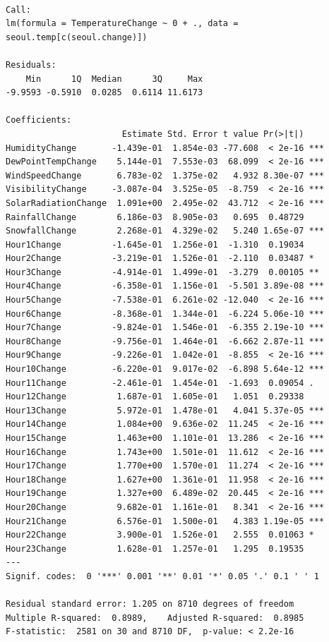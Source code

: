\documentclass[
  letterpaper,
  DIV=11,
  numbers=noendperiod]{scrartcl}
\begin{document}
\begin{verbatim}

Call:
lm(formula = TemperatureChange ~ 0 + ., data = seoul.temp[c(seoul.change)])

Residuals:
    Min      1Q  Median      3Q     Max 
-9.9593 -0.5910  0.0285  0.6114 11.6173 

Coefficients:
                       Estimate Std. Error t value Pr(>|t|)    
HumidityChange       -1.439e-01  1.854e-03 -77.608  < 2e-16 ***
DewPointTempChange    5.144e-01  7.553e-03  68.099  < 2e-16 ***
WindSpeedChange       6.783e-02  1.375e-02   4.932 8.30e-07 ***
VisibilityChange     -3.087e-04  3.525e-05  -8.759  < 2e-16 ***
SolarRadiationChange  1.091e+00  2.495e-02  43.712  < 2e-16 ***
RainfallChange        6.186e-03  8.905e-03   0.695  0.48729    
SnowfallChange        2.268e-01  4.329e-02   5.240 1.65e-07 ***
Hour1Change          -1.645e-01  1.256e-01  -1.310  0.19034    
Hour2Change          -3.219e-01  1.526e-01  -2.110  0.03487 *  
Hour3Change          -4.914e-01  1.499e-01  -3.279  0.00105 ** 
Hour4Change          -6.358e-01  1.156e-01  -5.501 3.89e-08 ***
Hour5Change          -7.538e-01  6.261e-02 -12.040  < 2e-16 ***
Hour6Change          -8.368e-01  1.344e-01  -6.224 5.06e-10 ***
Hour7Change          -9.824e-01  1.546e-01  -6.355 2.19e-10 ***
Hour8Change          -9.756e-01  1.464e-01  -6.662 2.87e-11 ***
Hour9Change          -9.226e-01  1.042e-01  -8.855  < 2e-16 ***
Hour10Change         -6.220e-01  9.017e-02  -6.898 5.64e-12 ***
Hour11Change         -2.461e-01  1.454e-01  -1.693  0.09054 .  
Hour12Change          1.687e-01  1.605e-01   1.051  0.29338    
Hour13Change          5.972e-01  1.478e-01   4.041 5.37e-05 ***
Hour14Change          1.084e+00  9.636e-02  11.245  < 2e-16 ***
Hour15Change          1.463e+00  1.101e-01  13.286  < 2e-16 ***
Hour16Change          1.743e+00  1.501e-01  11.612  < 2e-16 ***
Hour17Change          1.770e+00  1.570e-01  11.274  < 2e-16 ***
Hour18Change          1.627e+00  1.361e-01  11.958  < 2e-16 ***
Hour19Change          1.327e+00  6.489e-02  20.445  < 2e-16 ***
Hour20Change          9.682e-01  1.161e-01   8.341  < 2e-16 ***
Hour21Change          6.576e-01  1.500e-01   4.383 1.19e-05 ***
Hour22Change          3.900e-01  1.526e-01   2.555  0.01063 *  
Hour23Change          1.628e-01  1.257e-01   1.295  0.19535    
---
Signif. codes:  0 '***' 0.001 '**' 0.01 '*' 0.05 '.' 0.1 ' ' 1

Residual standard error: 1.205 on 8710 degrees of freedom
Multiple R-squared:  0.8989,    Adjusted R-squared:  0.8985 
F-statistic:  2581 on 30 and 8710 DF,  p-value: < 2.2e-16
\end{verbatim}
\end{document}
